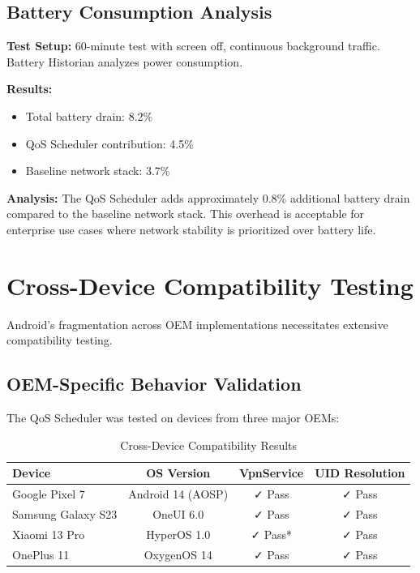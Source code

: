 \subsection{Battery Consumption Analysis}

\textbf{Test Setup:} 60-minute test with screen off, continuous background traffic. Battery Historian analyzes power consumption.

\textbf{Results:}
\begin{itemize}
    \item Total battery drain: 8.2\%
    \item QoS Scheduler contribution: 4.5\%
    \item Baseline network stack: 3.7\%
\end{itemize}

\textbf{Analysis:} The QoS Scheduler adds approximately 0.8\% additional battery drain compared to the baseline network stack. This overhead is acceptable for enterprise use cases where network stability is prioritized over battery life.

\section{Cross-Device Compatibility Testing}
\label{sec:compatibility_testing}

Android's fragmentation across OEM implementations necessitates extensive compatibility testing.

\subsection{OEM-Specific Behavior Validation}

The QoS Scheduler was tested on devices from three major OEMs:

\begin{table}[H]
\centering
\caption{Cross-Device Compatibility Results}
\label{tab:compatibility_results}
\begin{tabular}{@{}lccc@{}}
\toprule
\textbf{Device} & \textbf{OS Version} & \textbf{VpnService} & \textbf{UID Resolution} \\
\midrule
Google Pixel 7 & Android 14 (AOSP) & ✓ Pass & ✓ Pass \\
Samsung Galaxy S23 & OneUI 6.0 & ✓ Pass & ✓ Pass \\
Xiaomi 13 Pro & HyperOS 1.0 & ✓ Pass* & ✓ Pass \\
OnePlus 11 & OxygenOS 14 & ✓ Pass & ✓ Pass \\
\bottomrule
\end{tabular}
\end{table}

